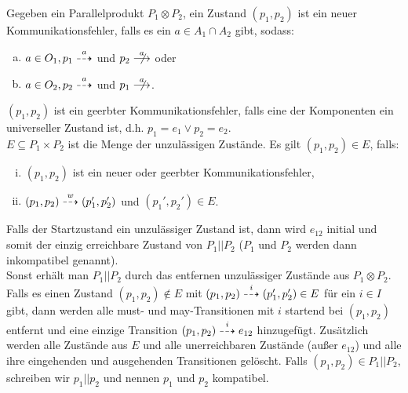 \begin{Def}[Parallelkomposition]
  Gegeben ein Parallelprodukt $P_1\otimes P_2$, ein Zustand $(p_1,p_2)$ ist ein
  neuer Kommunikationsfehler, falls es ein $a\in A_1\cap A_2$ gibt, sodass:
  \begin{enumerate}[(a)]
    \item $a\in O_1, p_1\may[a]$ und $p_2\nmust[a]$ oder
    \item $a\in O_2, p_2\may[a]$ und $p_1\nmust[a]$.
  \end{enumerate}
  $(p_1,p_2)$ ist ein geerbter Kommunikationsfehler, falls eine der Komponenten
  ein universeller Zustand ist, d.h. $p_1=e_1\lor p_2=e_2$.\\
  $E\subseteq P_1\times P_2$ ist die Menge der unzulässigen Zustände. Es gilt
  $(p_1,p_2)\in E$, falls:
  \begin{enumerate}[(i)]
    \item $(p_1,p_2)$ ist ein neuer oder geerbter Kommunikationsfehler,
    \item $(p_1,p_2)\may[w] (p_1',p_2')$ und $(p_1',p_2')\in E$.
  \end{enumerate}
  Falls der Startzustand ein unzulässiger Zustand ist, dann wird $e_{12}$
  initial und somit der einzig erreichbare Zustand von $P_1||P_2$ ($P_1$ und
  $P_2$ werden dann inkompatibel genannt).\\
  Sonst erhält man $P_1||P_2$ durch das entfernen unzulässiger Zustände aus
  $P_1\otimes P_2$. Falls es einen Zustand $(p_1,p_2)\notin E$ mit
  $(p_1,p_2)\may[i](p_1',p_2')\in E$ für ein $i\in I$ gibt, dann werden alle
  must- und may-Transitionen mit $i$ startend bei $(p_1,p_2)$ entfernt und eine
  einzige Transition $(p_1,p_2)\may[i]e_{12}$ hinzugefügt. Zusätzlich werden
  alle Zustände aus $E$ und alle unerreichbaren Zustände (außer $e_{12}$) und
  alle ihre eingehenden und ausgehenden Transitionen gelöscht. Falls
  $(p_1,p_2)\in P_1||P_2$, schreiben wir $p_1||p_2$ und nennen $p_1$ und $p_2$
  kompatibel.
\end{Def}

